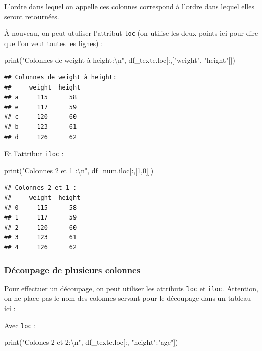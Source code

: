 \documentclass[12pt,]{book}
\newenvironment{Shaded}{\begin{snugshade}}{\end{snugshade}}
\newcommand{\DecValTok}[1]{\textcolor[rgb]{0.00,0.00,0.81}{#1}}
\newcommand{\CharTok}[1]{\textcolor[rgb]{0.31,0.60,0.02}{#1}}
\newcommand{\StringTok}[1]{\textcolor[rgb]{0.31,0.60,0.02}{#1}}
\newcommand{\BuiltInTok}[1]{#1}
\newcommand{\NormalTok}[1]{#1}
\numberwithin{equation}{section}
\numberwithin{countremarque}{section}
\begin{document}
L'ordre dans lequel on appelle ces colonnes correspond à l'ordre dans
lequel elles seront retournées.

À nouveau, on peut utuliser l'attribut \texttt{loc} (on utilise les deux
points ici pour dire que l'on veut toutes les lignes) :

\begin{Shaded}
\begin{Highlighting}[]
\BuiltInTok{print}\NormalTok{(}\StringTok{"Colonnes de weight à height:}\CharTok{\textbackslash{}n}\StringTok{"}\NormalTok{, df_texte.loc[:,[}\StringTok{"weight"}\NormalTok{, }\StringTok{"height"}\NormalTok{]])}
\end{Highlighting}
\end{Shaded}

\begin{lstlisting}
## Colonnes de weight à height:
##     weight  height
## a     115      58
## e     117      59
## c     120      60
## b     123      61
## d     126      62
\end{lstlisting}

Et l'attribut \texttt{iloc} :

\begin{Shaded}
\begin{Highlighting}[]
\BuiltInTok{print}\NormalTok{(}\StringTok{"Colonnes 2 et 1 :}\CharTok{\textbackslash{}n}\StringTok{"}\NormalTok{, df_num.iloc[:,[}\DecValTok{1}\NormalTok{,}\DecValTok{0}\NormalTok{]])}
\end{Highlighting}
\end{Shaded}

\begin{lstlisting}
## Colonnes 2 et 1 :
##     weight  height
## 0     115      58
## 1     117      59
## 2     120      60
## 3     123      61
## 4     126      62
\end{lstlisting}

\subsubsection{Découpage de plusieurs
colonnes}\label{decoupage-df-colonnes}

Pour effectuer un découpage, on peut utiliser les attributs \texttt{loc}
et \texttt{iloc}. Attention, on ne place pas le nom des colonnes servant
pour le découpage dans un tableau ici :

Avec \texttt{loc} :

\begin{Shaded}
\begin{Highlighting}[]
\BuiltInTok{print}\NormalTok{(}\StringTok{"Colones 2 et 2:}\CharTok{\textbackslash{}n}\StringTok{"}\NormalTok{, df_texte.loc[:, }\StringTok{"height"}\NormalTok{:}\StringTok{"age"}\NormalTok{])}
\end{Highlighting}
\end{Shaded}
\end{document}
